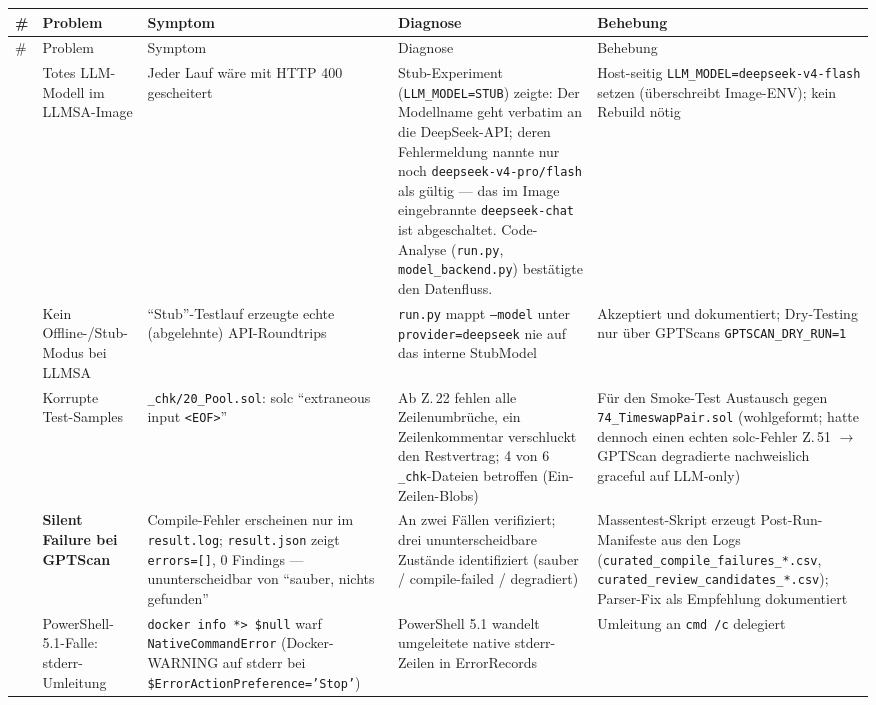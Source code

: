 \documentclass[11pt,a4paper]{scrartcl}
\newcommand{\code}[1]{\texttt{#1}}
\begin{document}
{\footnotesize
\begin{longtable}{@{}L{0.5cm} L{2.4cm} L{3.0cm} L{4.4cm} L{4.0cm}@{}}
\toprule
\# & Problem & Symptom & Diagnose & Behebung \\
\midrule
\endfirsthead
\toprule
\# & Problem & Symptom & Diagnose & Behebung \\
\midrule
\endhead
\bottomrule
{} & Totes LLM-Modell im LLMSA-Image & Jeder Lauf wäre mit HTTP 400 gescheitert & Stub-Experiment (\code{LLM\_MODEL=STUB}) zeigte: Der Modellname geht verbatim an die DeepSeek-API; deren Fehlermeldung nannte nur noch \code{deepseek-v4-pro/flash} als gültig --- das im Image eingebrannte \code{deepseek-chat} ist abgeschaltet. Code-Analyse (\code{run.py}, \code{model\_backend.py}) bestätigte den Datenfluss. & Host-seitig \code{LLM\_MODEL=deepseek-v4-flash} setzen (überschreibt Image-ENV); kein Rebuild nötig \\
 & Kein Offline-/Stub-Modus bei LLMSA & \enquote{Stub}-Testlauf erzeugte echte (abgelehnte) API-Roundtrips & \code{run.py} mappt \code{--model} unter \code{provider=deepseek} nie auf das interne StubModel & Akzeptiert und dokumentiert; Dry-Testing nur über GPTScans \code{GPTSCAN\_DRY\_RUN=1} \\
 & Korrupte Test-Samples & \code{\_chk/20\_Pool.sol}: solc \enquote{extraneous input \code{<EOF>}} & Ab Z.\,22 fehlen alle Zeilenumbrüche, ein Zeilenkommentar verschluckt den Restvertrag; 4 von 6 \code{\_chk}-Dateien betroffen (Ein-Zeilen-Blobs) & Für den Smoke-Test Austausch gegen \code{74\_TimeswapPair.sol} (wohlgeformt; hatte dennoch einen echten solc-Fehler Z.\,51 $\rightarrow$ GPTScan degradierte nachweislich graceful auf LLM-only) \\
 & \textbf{Silent Failure bei GPTScan} & Compile-Fehler erscheinen nur im \code{result.log}; \code{result.json} zeigt \code{errors=[]}, 0 Findings --- ununterscheidbar von \enquote{sauber, nichts gefunden} & An zwei Fällen verifiziert; drei ununterscheidbare Zustände identifiziert (sauber / compile-failed / degradiert) & Massentest-Skript erzeugt Post-Run-Manifeste aus den Logs (\code{curated\_compile\_failures\_*.csv}, \code{curated\_review\_candidates\_*.csv}); Parser-Fix als Empfehlung dokumentiert \\
 & PowerShell-5.1-Falle: stderr-Umleitung & \code{docker info *> \$null} warf \code{NativeCommandError} (Docker-WARNING auf stderr bei \code{\$ErrorActionPreference='Stop'}) & PowerShell 5.1 wandelt umgeleitete native stderr-Zeilen in ErrorRecords & Umleitung an \code{cmd /c} delegiert \\

\end{longtable}}
\end{document}
